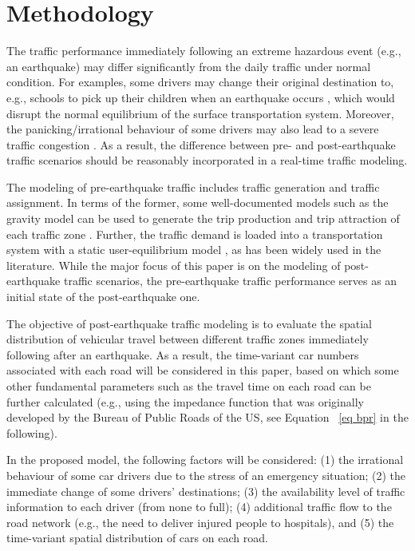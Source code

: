 \documentclass[review,11pt,nonatbib]{elsarticle}
\begin{document}
\section{Methodology}
The traffic performance immediately following an extreme hazardous event (e.g., an earthquake) may differ significantly from the daily traffic under normal condition. For examples, some drivers may change their original destination to, e.g., schools to pick up their children when an earthquake occurs \citep{liu2008analysis,ahn2014study}, which would disrupt the normal equilibrium of the surface transportation system. Moreover, the panicking/irrational behaviour of some drivers may also lead to a severe traffic congestion \citep{nigg1984earthquakes,Helbing2000Simulating}. As a result, the difference between pre- and post-earthquake traffic scenarios should be reasonably incorporated in a real-time traffic modeling.
\par The modeling of pre-earthquake traffic includes traffic generation and traffic assignment. In terms of the former, some well-documented models such as the gravity model can be used to generate the trip production and trip attraction of each traffic zone \citep{moriarty2007modeling,chang2012post}. Further, the traffic demand is loaded into a transportation system with a static user-equilibrium model \citep{beckmann1956studies}, as has been widely used in the literature.  While the major focus of this paper is on the modeling of post-earthquake traffic scenarios, the pre-earthquake traffic performance  serves as an initial state of the post-earthquake one.
\par The objective of post-earthquake traffic modeling is to evaluate the spatial distribution of vehicular travel between different traffic zones immediately following after an earthquake. As a result, the time-variant car numbers associated with each road will be considered in this paper, based on which some other fundamental parameters such as the travel time on each road can be further calculated (e.g., using the impedance function that was originally developed by the Bureau of Public Roads of the US, see Equation ~\eqref{eq bpr} in the following).
\par In the proposed model, the following factors will be considered: (1) the irrational behaviour of some car drivers due to the stress of an emergency situation; (2) the immediate change of some drivers' destinations; (3) the availability level of traffic information to each driver (from none to full); (4) additional traffic flow to the road network (e.g., the need to deliver injured people to hospitals), and (5) the time-variant spatial distribution of cars on each road.
\end{document}
